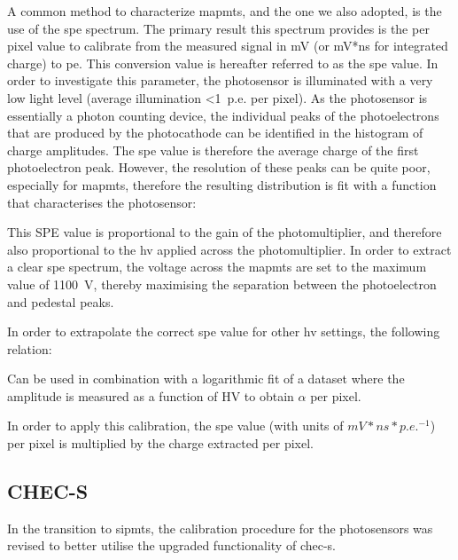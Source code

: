 A common method to characterize \glspl{mapmt}, and the one we also adopted, is the use of the \gls{spe} spectrum. The primary result this spectrum provides is the per pixel value to calibrate from the measured signal in mV (or mV*ns for integrated charge) to \gls{pe}. This conversion value is hereafter referred to as the \gls{spe} value. In order to investigate this parameter, the photosensor is illuminated with a very low light level (average illumination <1~p.e. per pixel). As the photosensor is essentially a photon counting device, the individual peaks of the photoelectrons that are produced by the photocathode can be identified in the histogram of charge amplitudes. The \gls{spe} value is therefore the average charge of the first photoelectron peak. However, the resolution of these peaks can be quite poor, especially for \glspl{mapmt}, therefore the resulting distribution is fit with a function that characterises the photosensor: 


This SPE value is proportional to the gain of the photomultiplier, and therefore also proportional to the \gls{hv} applied across the photomultiplier. In order to extract a clear \gls{spe} spectrum, the voltage across the \glspl{mapmt} are set to the maximum value of 1100~V, thereby maximising the separation between the photoelectron and pedestal peaks.

In order to extrapolate the correct \gls{spe} value for other \gls{hv} settings, the following relation:

Can be used in combination with a logarithmic  fit of a dataset where the amplitude is measured as a function of HV to obtain $\alpha$ per pixel. 


In order to apply this calibration, the \gls{spe} value (with units of $mV*ns*p.e.^{-1}$) per pixel is multiplied by the charge extracted per pixel. 

\subsection{CHEC-S}

In the transition to \glspl{sipmt}, the calibration procedure for the photosensors was revised to better utilise the upgraded functionality of \gls{chec-s}. 

